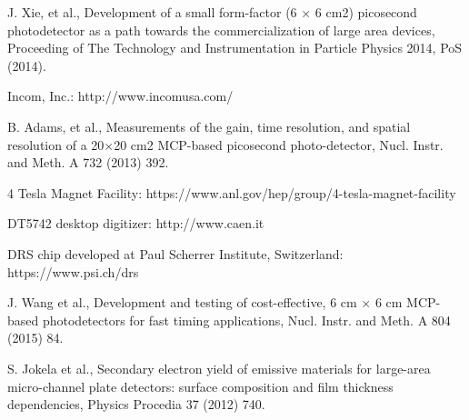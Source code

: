\documentclass[preprint,5p]{elsarticle}
\begin{document}
\begin{thebibliography}{00}
J. Xie, et al., Development of a small form-factor (6 × 6 cm2) picosecond photodetector as a path towards the commercialization of large area devices, Proceeding of The Technology and Instrumentation in Particle Physics 2014, PoS (2014).

Incom, Inc.: http://www.incomusa.com/

B. Adams, et al., Measurements of the gain, time resolution, and spatial resolution of a 20×20 cm2 MCP-based picosecond photo-detector, Nucl. Instr. and Meth. A 732 (2013) 392.

4 Tesla Magnet Facility: https://www.anl.gov/hep/group/4-tesla-magnet-facility 

DT5742 desktop digitizer: http://www.caen.it

DRS chip developed at Paul Scherrer Institute, Switzerland: https://www.psi.ch/drs

J. Wang et al., Development and testing of cost-effective, 6 cm × 6 cm MCP-based photodetectors for fast timing applications, Nucl. Instr. and Meth. A 804 (2015) 84.

S. Jokela et al., Secondary electron yield of emissive materials for large-area micro-channel plate detectors: surface composition and film thickness dependencies, Physics Procedia 37 (2012) 740.


\end{thebibliography}
\end{document}
